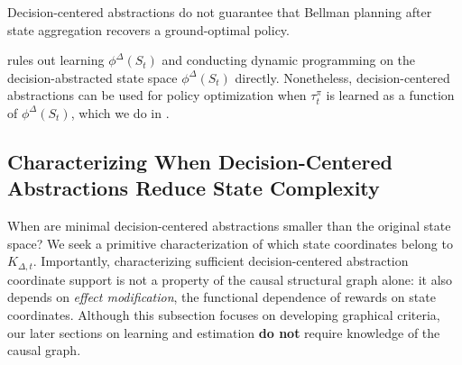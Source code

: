 \documentclass[opre,nonblindrev]{informs4}
\newenvironment{revision}{\begingroup\color{revisionblue}\ignorespaces}{\endgroup}
\newcommand{\blipadv}{\tau}
\begin{document}
\begin{revision}
\begin{proposition}
\label{prop:no-abstract-planning}
Decision-centered abstractions do not guarantee that Bellman planning after
state aggregation recovers a ground-optimal policy.
\end{proposition}

 rules out learning $\phi^\Delta(S_t)$ and conducting dynamic programming on the decision-abstracted state space $\phi^\Delta(S_t)$ directly. Nonetheless, decision-centered abstractions can be used for policy optimization when $\blipadv_t^\pi$ is learned as a function of $\phi^\Delta(S_t)$, which we do in .










\subsection{Characterizing When Decision-Centered Abstractions Reduce State Complexity}

When are minimal decision-centered abstractions smaller than the original state space? We seek a primitive characterization of which state coordinates belong to
$K_{\Delta,t}$. %
Importantly, characterizing sufficient decision-centered abstraction coordinate support is not a property of the causal structural graph alone: it also depends on \textit{effect modification}, the functional dependence of rewards on state coordinates. Although this subsection focuses on developing graphical criteria, our later sections on learning and estimation \textbf{do not} require knowledge of the causal graph. 


\end{revision}
\end{document}
